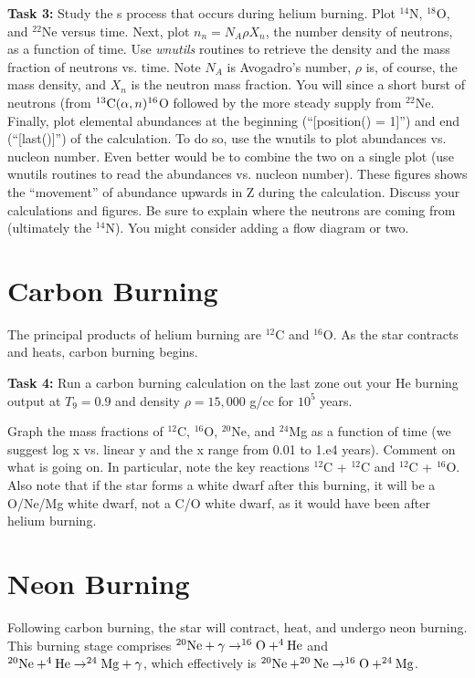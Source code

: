 \documentclass[manuscript]{aastex62}
\begin{document}
{\bf Task 3:}
Study the s process that occurs during helium burning.
Plot $^{14}$N, $^{18}$O, and $^{22}$Ne versus time.
Next, plot $n_n = N_A \rho X_n$, the number
density of neutrons, as a function of time.
Use {\em wnutils} routines to retrieve the density and the mass fraction
of neutrons vs. time.
Note $N_A$ is Avogadro's number,
$\rho$ is, of course, the mass density, and $X_n$ is the neutron mass fraction.
You will since a short burst of neutrons (from $^{13}{\rm C}(\alpha, n)^{16}$O
followed by the more steady supply from $^{22}$Ne.
Finally, plot elemental abundances at the beginning (``[position() = 1]'') and
end (``[last()]'') of the calculation.
To do so, use the wnutils to plot abundances vs. nucleon number.
Even better would be to combine the two on a single plot (use wnutils
routines to read the abundances vs. nucleon number).
These figures shows the ``movement''
of abundance upwards in Z during the calculation.
Discuss your calculations and figures.  
Be sure to explain where the neutrons are coming from
(ultimately the $^{14}$N).  You might consider adding a flow diagram or two.

\section{Carbon Burning} \label{sec:C}

The principal products of helium burning are $^{12}$C and $^{16}$O.  As the
star contracts and heats, carbon burning begins.

{\bf Task 4:}
Run a carbon burning calculation on the last zone out your He burning output
at $T_9 = 0.9$ and density
$\rho = 15,000$ g/cc for $10^5$ years.

Graph the mass fractions of $^{12}$C,
$^{16}$O, $^{20}$Ne, and $^{24}$Mg as a function of time (we suggest log x vs.
linear y and the x range from 0.01 to 1.e4 years).  Comment on what is going
on.  In particular, note the key reactions $^{12}$C + $^{12}$C and $^{12}$C +
$^{16}$O.  Also note that if the star forms a white dwarf after this burning,
it will be a O/Ne/Mg white dwarf, not a C/O white dwarf, as it would have
been after helium burning.

\section{Neon Burning} \label{sec:Ne}

Following carbon burning, the star will contract, heat, and undergo neon
burning.  This burning stage comprises $^{20}{\rm Ne} + \gamma \to ^{16}{\rm O}
+ ^4{\rm He}$ and $^{20}{\rm Ne} + ^4{\rm He} \to ^{24}{\rm Mg} + \gamma$,
which effectively is $^{20}{\rm Ne} + ^{20}{\rm Ne} \to ^{16}{\rm O} +
^{24}{\rm Mg}$.
\end{document}
